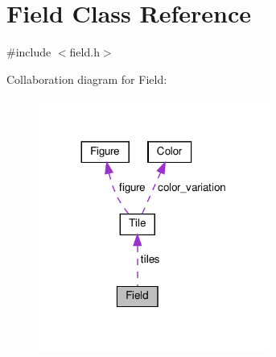 \hypertarget{classField}{}\section{Field Class Reference}
\label{classField}


{\ttfamily \#include $<$field.\+h$>$}



Collaboration diagram for Field\+:
\nopagebreak
\begin{figure}[H]
\begin{center}
\leavevmode
\includegraphics[width=215pt]{d3/d0e/classField__coll__graph}
\end{center}
\end{figure}
